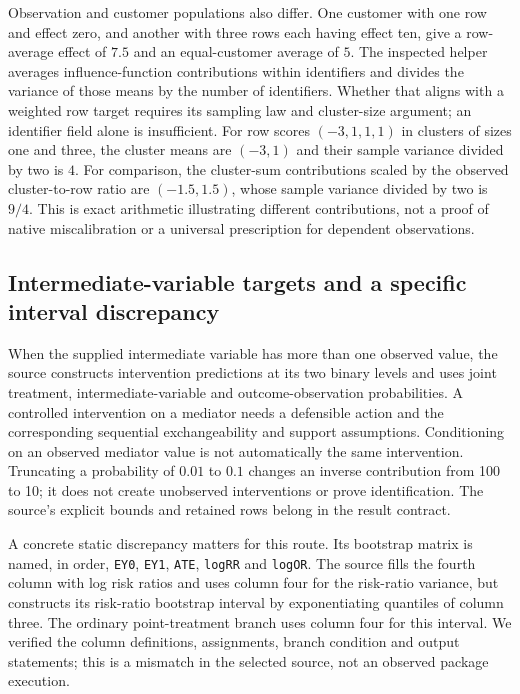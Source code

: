 Observation and customer populations also differ. One customer with one row
and effect zero, and another with three rows each having effect ten, give a
row-average effect of $7.5$ and an equal-customer average of $5$. The inspected
helper averages influence-function contributions within identifiers and divides
the variance of those means by the number of identifiers. Whether that aligns
with a weighted row target requires its sampling law and cluster-size argument;
an identifier field alone is insufficient.
For row scores $(-3,1,1,1)$ in clusters of sizes one and three, the cluster means
are $(-3,1)$ and their sample variance divided by two is $4$. For comparison,
the cluster-sum contributions scaled by the observed cluster-to-row ratio are
$(-1.5,1.5)$, whose sample variance divided by two is $9/4$. This is exact
arithmetic illustrating different contributions, not a proof of native
miscalibration or a universal prescription for dependent observations.
\citep{exec24_tmle_sources,exec24_tmle_contract}

\subsection{Intermediate-variable targets and a specific interval discrepancy}
When the supplied intermediate variable has more than one observed value, the
source constructs intervention predictions at its two binary levels and uses
joint treatment, intermediate-variable and outcome-observation probabilities.
A controlled intervention on a mediator needs a defensible action and the
corresponding sequential exchangeability and support assumptions. Conditioning
on an observed mediator value is not automatically the same intervention.
Truncating a probability of $0.01$ to $0.1$ changes an inverse contribution from
100 to 10; it does not create unobserved interventions or prove identification.
The source's explicit bounds and retained rows belong in the result contract.
\citep{exec24_tmle_sources,exec24_tmle_contract}

A concrete static discrepancy matters for this route. Its bootstrap matrix is
named, in order, \texttt{EY0}, \texttt{EY1}, \texttt{ATE}, \texttt{logRR} and
\texttt{logOR}. The source fills the fourth column with log risk ratios and
uses column four for the risk-ratio variance, but constructs its risk-ratio
bootstrap interval by exponentiating quantiles of column three. The ordinary
point-treatment branch uses column four for this interval. We verified the
column definitions, assignments, branch condition and output statements; this
is a mismatch in the selected source, not an observed package execution.
\citep{exec24_tmle_sources}

